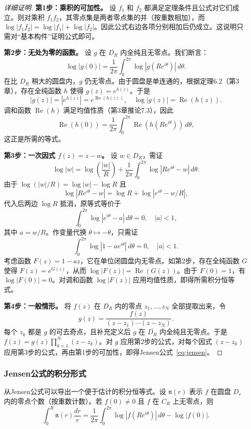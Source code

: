 \documentclass[UTF8]{ctexart}
\numberwithin{equation}{section}
\begin{document}
\begin{proof}[详细证明]
\textbf{第1步：乘积的可加性。}
设 $f_1$ 和 $f_2$ 都满足定理条件且公式对它们成立。则对乘积 $f_1f_2$，其零点集是两者零点集的并（按重数相加），而 $\log|f_1f_2| = \log|f_1| + \log|f_2|$。因此公式右边各项分别相加后仍成立。这说明只需对“基本构件”证明公式即可。

\textbf{第2步：无处为零的函数。}
设 $g$ 在 $\overline{D_R}$ 内全纯且无零点。我们断言：
\[
\log|g(0)| = \frac{1}{2\pi} \int_0^{2\pi} \log|g(Re^{i\theta})| \, d\theta .
\]
在比 $D_R$ 稍大的圆盘内，$g$ 仍无零点。由于圆盘是单连通的，根据定理6.2（第3章），存在全纯函数 $h$ 使得 $g(z) = e^{h(z)}$。于是
\[
|g(z)| = |e^{h(z)}| = e^{\operatorname{Re}(h(z))}, \quad \log|g(z)| = \operatorname{Re}(h(z)).
\]
调和函数 $\operatorname{Re}(h)$ 满足均值性质（第3章推论7.3），因此
\[
\operatorname{Re}(h(0)) = \frac{1}{2\pi} \int_0^{2\pi} \operatorname{Re}(h(Re^{i\theta})) \, d\theta ,
\]
这正是所需的等式。

\textbf{第3步：一次因式 $f(z)=z-w$。}
设 $w\in D_R$，需证
\[
\log|w| = \log\left(\frac{|w|}{R}\right) + \frac{1}{2\pi} \int_0^{2\pi} \log|Re^{i\theta} - w| \, d\theta .
\]
由于 $\log(|w|/R) = \log|w| - \log R$ 且
\[
\log|Re^{i\theta} - w| = \log R + \log|e^{i\theta} - w/R|,
\]
代入后两边 $\log R$ 抵消，原等式等价于
\[
\int_0^{2\pi} \log|e^{i\theta} - a| \, d\theta = 0, \quad |a|<1,
\]
其中 $a = w/R$。作变量代换 $\theta\mapsto -\theta$，只需证
\[
\int_0^{2\pi} \log|1 - a e^{i\theta}| \, d\theta = 0, \quad |a|<1.
\]
考虑函数 $F(z) = 1 - az$，它在单位闭圆盘内无零点。如第2步，存在全纯函数 $G$ 使得 $F(z)=e^{G(z)}$，从而 $\log|F(z)| = \operatorname{Re}(G(z))$。由于 $F(0)=1$，有 $\log|F(0)|=0$。对调和函数 $\log|F(z)|$ 应用均值性质，即得所需积分恒等式。

\textbf{第4步：一般情形。}
将 $f(z)$ 在 $\overline{D_R}$ 内的零点 $z_1,\dots,z_N$ 全部提取出来，令
\[
g(z) = \frac{f(z)}{(z-z_1)\cdots(z-z_N)} .
\]
每个 $z_k$ 都是 $g$ 的可去奇点，且补充定义后 $g$ 在 $\overline{D_R}$ 内全纯且无零点。于是 $f(z) = g(z)\prod_{k=1}^N (z-z_k)$。对 $g$ 应用第2步的公式，对每个因式 $(z-z_k)$ 应用第3步的公式，再由第1步的可加性，即得Jensen公式~\eqref{eq:jensen}。
\end{proof}

\subsubsection{Jensen公式的积分形式}

从Jensen公式可以导出一个便于估计的积分恒等式。设 $\mathfrak{n}(r)$ 表示 $f$ 在圆盘 $D_r$ 内的零点个数（按重数计数）。若 $f(0)\neq0$ 且 $f$ 在 $C_R$ 上无零点，则
\begin{equation}\label{eq:jensen-integral}
\int_0^R \mathfrak{n}(r) \frac{dr}{r} = \frac{1}{2\pi} \int_0^{2\pi} \log|f(Re^{i\theta})| \, d\theta - \log|f(0)|.
\end{equation}
\end{document}
